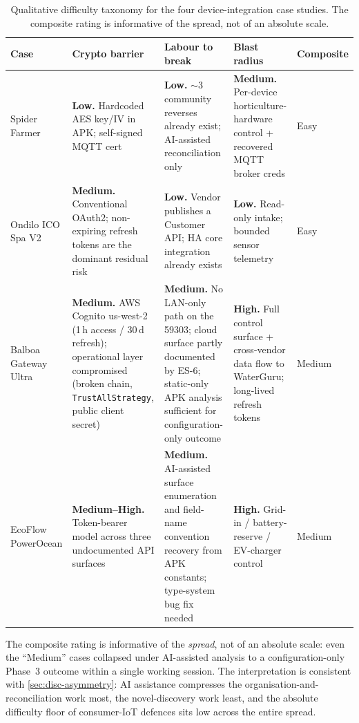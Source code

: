 \documentclass[11pt,a4paper]{article}
\begin{document}
\begin{table}[ht]
\centering
\caption{Qualitative difficulty taxonomy for the four
device-integration case studies. The composite rating is informative of
the spread, not of an absolute scale.}
\label{tab:difficulty-taxonomy}
\footnotesize
\begin{tabular}{p{2.6cm} p{3.3cm} p{3.3cm} p{3.3cm} p{1.4cm}}
\toprule
\textbf{Case} & \textbf{Crypto barrier} & \textbf{Labour to break} & \textbf{Blast radius} & \textbf{Composite} \\
\midrule
Spider Farmer
  & \textbf{Low.} Hardcoded AES key/IV in APK; self-signed MQTT cert
  & \textbf{Low.} $\sim$3 community reverses already exist; AI-assisted reconciliation only
  & \textbf{Medium.} Per-device horticulture-hardware control + recovered MQTT broker creds
  & Easy \\
Ondilo ICO Spa V2
  & \textbf{Medium.} Conventional OAuth2; non-expiring refresh tokens are the dominant residual risk
  & \textbf{Low.} Vendor publishes a Customer API; HA core integration already exists
  & \textbf{Low.} Read-only intake; bounded sensor telemetry
  & Easy \\
Balboa Gateway Ultra
  & \textbf{Medium.} AWS Cognito us-west-2 (1\,h access / 30\,d refresh); operational layer compromised (broken chain, \texttt{TrustAllStrategy}, public client secret)
  & \textbf{Medium.} No LAN-only path on the 59303; cloud surface partly documented by ES-6; static-only APK analysis sufficient for configuration-only outcome
  & \textbf{High.} Full control surface + cross-vendor data flow to WaterGuru; long-lived refresh tokens
  & Medium \\
EcoFlow PowerOcean
  & \textbf{Medium--High.} Token-bearer model across three undocumented API surfaces
  & \textbf{Medium.} AI-assisted surface enumeration and field-name convention recovery from APK constants; type-system bug fix needed
  & \textbf{High.} Grid-in / battery-reserve / EV-charger control
  & Medium \\
\bottomrule
\end{tabular}
\end{table}

The composite rating is informative of the \emph{spread}, not of an
absolute scale: even the ``Medium'' cases collapsed under AI-assisted
analysis to a configuration-only Phase~3 outcome within a single
working session. The interpretation is consistent with
\cref{sec:disc-asymmetry}: AI assistance compresses the
organisation-and-reconciliation work most, the novel-discovery work
least, and the absolute difficulty floor of consumer-IoT defences sits
low across the entire spread.
\end{document}

